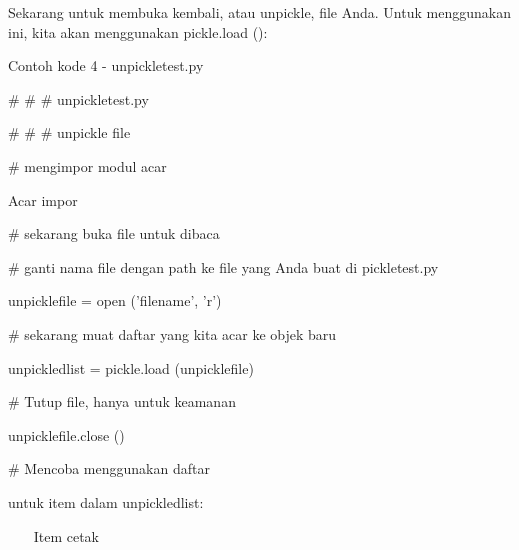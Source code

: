 \noindent 
Sekarang untuk membuka kembali, atau unpickle, file Anda. Untuk menggunakan ini, kita akan menggunakan pickle.load (): \par
Contoh kode 4 - unpickletest.py \par
\vspace{12pt}
\noindent 
 $  \#  $ $  \#  $ $  \#  $ unpickletest.py \par
\noindent 
 $  \#  $ $  \#  $ $  \#  $ unpickle file \par
\vspace{12pt}
\noindent 
 $  \#  $ mengimpor modul acar \par
\noindent 
Acar impor \par
\vspace{12pt}
\noindent 
 $  \#  $ sekarang buka file untuk dibaca \par
\noindent 
 $  \#  $ ganti nama file dengan path ke file yang Anda buat di pickletest.py \par
\noindent 
unpicklefile = open ('filename', 'r') \par
\vspace{12pt}
\noindent 
 $  \#  $ sekarang muat daftar yang kita acar ke objek baru \par
\noindent 
unpickledlist = pickle.load (unpicklefile) \par
\vspace{12pt}
\noindent 
 $  \#  $ Tutup file, hanya untuk keamanan \par
\noindent 
unpicklefile.close () \par
\vspace{12pt}
\noindent 
 $  \#  $ Mencoba menggunakan daftar \par
\noindent 
untuk item dalam unpickledlist: \par
\noindent 
~~~ Item cetak \par
\vspace{12pt}

